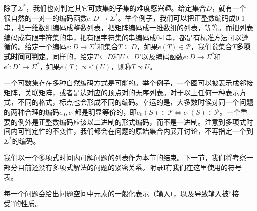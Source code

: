 \documentclass[twocolumn]{article}
\theoremstyle{nonumberplain}%
\begin{document}
    除了$\Sigma^*$，我们也对判定其它可数集的子集的难度感兴趣。给定集合$D$，就有一个很自然的一对一的编码函数$e:D\to\Sigma^*$。举个例子，我们可以把正整数编码成0-1串，把一维数组编码成整数列表，把矩阵编码成一维数组的列表，等等。而把列表编码成有限字符集的串，把有限字符集的串编码成0-1串，都是有标准方法可以遵循的。给定一个编码$e:D\to\Sigma^*$和集合$T\subseteq D$，如果$e(T)\in\mathcal{P}$，我们说集合$T${\bf 多项式时间可判定}。同样的，给定$T\subseteq D$和$U\subseteq D'$以及编码函数$e:D\to\Sigma^*$和$e':D'\to\Sigma^*$，如果$e(T)\propto e'(U)$，则称$T\propto U$。

    一个可数集存在多种自然编码方式是可能的。举个例子，一个图可以被表示成邻接矩阵，关联矩阵，或者是边对应的顶点对的无序列表。对于以上任何一种表示方式，不同的格式，标点也会形成不同的编码。幸运的是，大多数时候对同一个问题的两种合理的编码$e_0,e_1$都是明显等价的，即$e_0(S)\in\mathcal{P}\Leftrightarrow e_1(S)\in\mathcal{P}$。一个重要的例外是正整数编码应该以二进制的形式编码，而不是一进制。注意到多项式时间内可判定性的不变性，我们都会在问题的原始集合内展开讨论，不再指定一个到$\Sigma^*$的编码。

    我们以一个多项式时间内可解问题的列表作为本节的结束。下一节，我们将考察一部分目前还没有多项式解法的问题的紧密关系。附录I有我们在这里使用的符号表。

    每一个问题会给出问题空间中元素的一般化表示（输入），以及导致输入被“接受”的性质。
\end{document}
